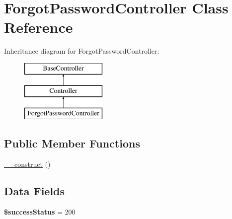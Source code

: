 \hypertarget{class_app_1_1_http_1_1_controllers_1_1_auth_1_1_forgot_password_controller}{}\section{Forgot\+Password\+Controller Class Reference}
\label{class_app_1_1_http_1_1_controllers_1_1_auth_1_1_forgot_password_controller}
Inheritance diagram for Forgot\+Password\+Controller\+:\begin{figure}[H]
\begin{center}
\leavevmode
\includegraphics[height=3.000000cm]{class_app_1_1_http_1_1_controllers_1_1_auth_1_1_forgot_password_controller}
\end{center}
\end{figure}
\subsection*{Public Member Functions}
\begin{DoxyCompactItemize}
\item 
\mbox{\hyperlink{class_app_1_1_http_1_1_controllers_1_1_auth_1_1_forgot_password_controller_a095c5d389db211932136b53f25f39685}{\+\_\+\+\_\+construct}} ()
\end{DoxyCompactItemize}
\subsection*{Data Fields}
\begin{DoxyCompactItemize}
\item 
\mbox{\label{class_app_1_1_http_1_1_controllers_1_1_auth_1_1_forgot_password_controller_a4fde01aada3b602338d7002a598a8763}} 
{\bfseries \$success\+Status} = 200
\end{DoxyCompactItemize}
